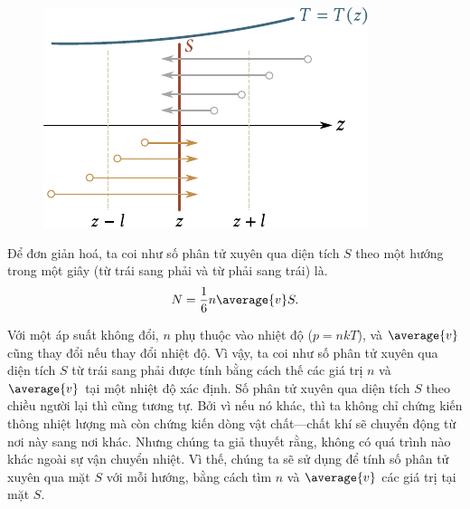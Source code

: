 \begin{figure}[!htb]
	\begin{center}
		\includegraphics[scale=1]{figures/ch_16/fig_16_7.pdf}
		\caption[]{}
		\label{fig:16_7}
	\end{center}
\end{figure}

Để đơn giản hoá, ta coi như số phân tử xuyên qua diện tích $S$ theo một hướng trong một giây (từ trái sang phải và từ phải sang trái) là.
\begin{equation}\label{eq:16_20}
    N = \frac{1}{6} n \average{v} S.
\end{equation}

Với một áp suất không đổi, $n$ phụ thuộc vào nhiệt độ ($p=nkT$), và $\average{v}$ cũng thay đổi nếu thay đổi nhiệt độ. Vì vậy, ta coi như số phân tử xuyên qua diện tích $S$ từ trái sang phải được tính bằng cách thế các giá trị $n$ và $\average{v}$ tại một nhiệt độ xác định. Số phân tử xuyên qua diện tích $S$ theo chiều người lại thì cũng tương tự. Bởi vì nếu nó khác, thì ta không chỉ chứng kiến thông nhiệt lượng mà còn chứng kiến dòng vật chất---chất khí sẽ chuyển động từ nơi này sang nơi khác. Nhưng chúng ta giả thuyết rằng, không có quá trình nào khác ngoài sự vận chuyển nhiệt. Vì thế, chúng ta sẽ sử dụng  để tính số phân tử xuyên qua mặt $S$ với mỗi hướng, bằng cách tìm $n$ và $\average{v}$ các giá trị tại mặt $S$.

